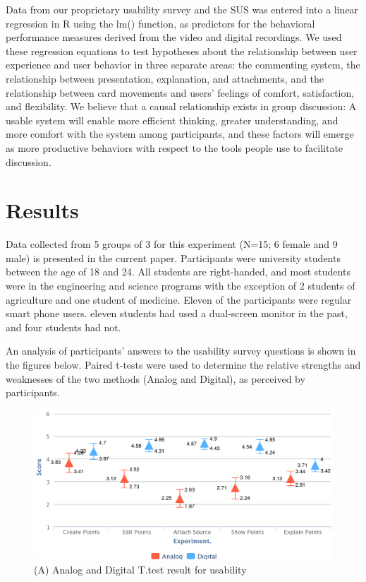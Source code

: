 \documentclass{sigchi}
\begin{document}
Data from our proprietary usability survey and the SUS was entered into a linear regression in R using the lm() function, as predictors for the behavioral performance measures derived from the video and digital recordings. We used these regression equations to test hypotheses about the relationship between user experience and user behavior in three separate areas: the commenting system, the relationship between presentation, explanation, and attachments, and the relationship between card movements and users' feelings of comfort, satisfaction, and flexibility. We believe that a causal relationship exists in group discussion: A usable system will enable more efficient thinking, greater understanding, and more comfort with the system among participants, and these factors will emerge as more productive behaviors with respect to the tools people use to facilitate discussion. 

\section{Results}

Data collected from 5 groups of 3 for this experiment (N=15; 6 female and 9 male) is presented in the current paper. Participants were university students between the age of 18 and 24. All students are right-handed, and most students were in the engineering and science programs with the exception of 2 students of agriculture and one student of medicine. Eleven of the participants were regular smart phone users. eleven students had  used a dual-screen monitor in the past, and four students had not. 

An analysis of participants' answers to the usability survey questions is shown in the figures below. Paired t-tests were used to determine the relative strengths and weaknesses of the two methods (Analog and Digital), as perceived by participants.


\begin{figure}[!h]
\centering
\includegraphics[width=1.0\columnwidth]{basic}
\caption{(A) Analog and Digital T.test result for usability}
\label{fig:figure1}
\end{figure}
\end{document}
